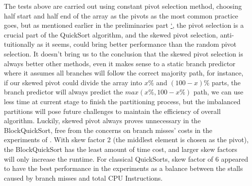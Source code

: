 \documentclass{article}
\begin{document}
The tests above are carried out using constant pivot selection method, choosing half start and half end of the array as the pivots as the most common practice goes,
but as mentioned earlier in the preliminaries part \hyperlink{ref:AnalysisOfBranchMissesInQuickSort}{`}, the pivot selection is a crucial part of the QuickSort algorithm, and the skewed pivot selection, anti-tuitionally as it seems, could bring better performance than the random pivot selection.
It doesn't bring us to the conclusion that the skewed pivot selection is always better other methods, even it makes sense to a static branch predictor where it assumes all branches will follow the correct majority path, for instance, if our skewed pivot could divide the array into $x\%$ and $(100-x)\%$ parts, the branch predictor will always predict the $max(x\%, 100-x\%)$ path,
we can use less time at current stage to finish the partitioning process, but the imbalanced partitions will pose future challenges to maintain the efficiency of overall algorithm. Luckily, skewed pivot always proves unnecessary in the BlockQuickSort, free from the concerns on branch misses' costs in the experiments of \cite{BlockQuickSort}. With skew factor 2 (the middlest element is chosen as the pivot), the BlockQuickSort has the least amount of time cost, and larger skew factors will only increase the runtime.
For classical QuickSorts, skew factor of 6 appeared to have the best performance in the experiments as a balance between the stalls caused by branch misses and total CPU Instructions.
\end{document}

